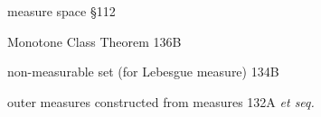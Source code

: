 measure space \S112













Monotone Class Theorem 136B





\indexmedskip















non-measurable set (for Lebesgue measure) 134B















\indexmedskip




















outer measures constructed from measures 132A {\it et seq.}

